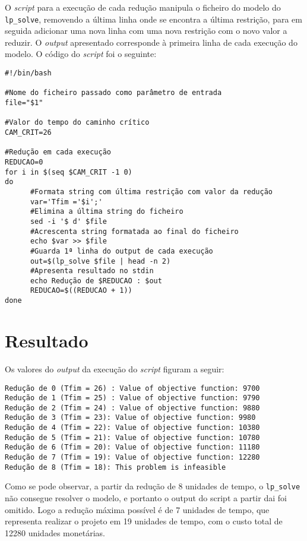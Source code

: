 O \emph{script} para a execução de cada redução manipula o ficheiro do modelo do
\texttt{lp\_solve}, removendo a última linha onde se encontra a última
restrição, para em seguida adicionar uma nova linha com uma nova restrição
com o novo valor a reduzir. O \emph{output} apresentado corresponde à primeira
linha de cada execução do modelo. O código do \emph{script} foi o seguinte:


\begin{verbatim}
#!/bin/bash

#Nome do ficheiro passado como parâmetro de entrada
file="$1"

#Valor do tempo do caminho crítico
CAM_CRIT=26

#Redução em cada execução
REDUCAO=0
for i in $(seq $CAM_CRIT -1 0)
do
      #Formata string com última restrição com valor da redução
      var='Tfim ='$i';'
      #Elimina a última string do ficheiro
      sed -i '$ d' $file
      #Acrescenta string formatada ao final do ficheiro
      echo $var >> $file
      #Guarda 1ª linha do output de cada execução
      out=$(lp_solve $file | head -n 2) 
      #Apresenta resultado no stdin
      echo Redução de $REDUCAO : $out
      REDUCAO=$((REDUCAO + 1))
done

\end{verbatim}


\newpage

\section{Resultado}

Os valores do \emph{output} da execução do \emph{script} figuram a seguir:

\begin{verbatim}
Redução de 0 (Tfim = 26) : Value of objective function: 9700
Redução de 1 (Tfim = 25) : Value of objective function: 9790
Redução de 2 (Tfim = 24) : Value of objective function: 9880
Redução de 3 (Tfim = 23): Value of objective function: 9980
Redução de 4 (Tfim = 22): Value of objective function: 10380
Redução de 5 (Tfim = 21): Value of objective function: 10780
Redução de 6 (Tfim = 20): Value of objective function: 11180
Redução de 7 (Tfim = 19): Value of objective function: 12280
Redução de 8 (Tfim = 18): This problem is infeasible

\end{verbatim}

Como se pode observar, a partir da redução de 8 unidades de tempo,
o \texttt{lp\_solve} não consegue resolver o modelo, e portanto o output do script a partir dai foi omitido. Logo a redução máxima
possível é de 7 unidades de tempo, que representa realizar o projeto em 19 unidades de tempo, com o custo total de 12280 unidades
monetárias.

